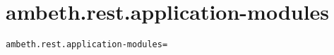\section{ambeth.rest.application-modules}
\label{configuration:AmbethRestApplicationModules}
\ClearAPI
\TODO%
\begin{lstlisting}[style=Props,caption={Usage example for \textit{ambeth.rest.application-modules}}]
ambeth.rest.application-modules=
\end{lstlisting}